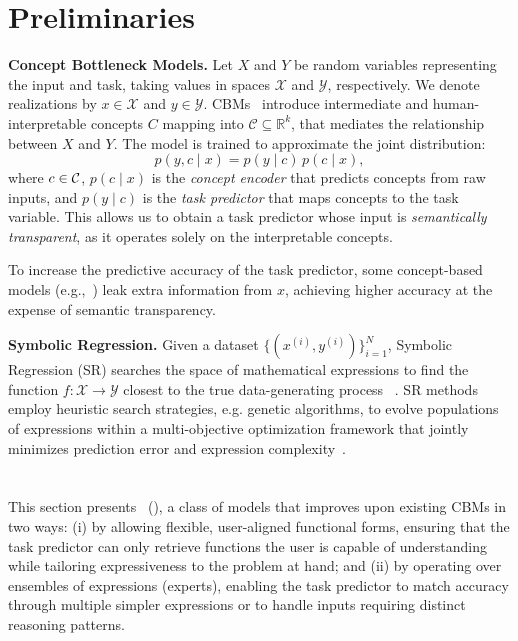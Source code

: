 \documentclass{article}
\theoremstyle{plain}
\theoremstyle{definition}
\theoremstyle{remark}
\newcommand{\mypar}[1]{\noindent\textbf{#1}}
\begin{document}
\section{Preliminaries}
\mypar{Concept Bottleneck Models.} 
Let $X$ and $Y$ be random variables representing the input and task, taking values in spaces $\mathcal{X}$ and $\mathcal{Y}$, respectively. We denote realizations by $x \in \mathcal{X}$ and $y \in \mathcal{Y}$.
CBMs~\citep{koh2020concept} introduce intermediate and human-interpretable concepts $C$ mapping into $\mathcal{C}\subseteq{\mathbb{R}^k}$, that mediates the relationship between $X$ and $Y$. The model is trained to approximate the joint distribution:
\begin{equation}
    p(y, c \mid x) = p(y \mid c)\, p(c \mid x),
    \label{eq:cbm_factorization}
\end{equation}
where $c\in\mathcal{C}$, $p(c \mid x)$ is the \emph{concept encoder} that predicts concepts from raw inputs, and $p(y \mid c)$ is the \emph{task predictor} that maps concepts to the task variable. This allows us to obtain a task predictor whose input is \emph{semantically transparent}, as it operates solely on the interpretable concepts.

To increase the predictive accuracy of the task predictor, some concept-based models (e.g.,~\citet{zarlenga2022concept,ismail2023concept}) leak extra information from $x$, achieving higher accuracy at the
expense of semantic transparency. 

\mypar{Symbolic Regression.} Given a dataset $\{(x^{(i)}, y^{(i)})\}_{i=1}^N$, Symbolic Regression (SR) searches the space of mathematical expressions to find the function $f: \mathcal{X} \rightarrow \mathcal{Y}$ closest to the true data-generating process ~\citep{schmidt2009distilling}.  SR methods  employ heuristic search strategies, e.g. genetic algorithms, to evolve populations of expressions within a multi-objective optimization framework that jointly minimizes prediction error and expression complexity~\citep{langley1979rediscovering, langley1981bacon, koza1994genetic,cranmer2023interpretable}.

\section{\class}
\label{sec:class_of_models}

This section presents \class~(\classacro), a class of models that improves upon existing CBMs in two ways: (i) by allowing flexible, user-aligned functional forms, ensuring that the task predictor can only retrieve functions the user is capable of understanding while tailoring expressiveness to the problem at hand; and (ii) by operating over ensembles of expressions (experts), enabling the task predictor to match accuracy through multiple simpler expressions or to handle inputs requiring distinct reasoning patterns.
\end{document}
